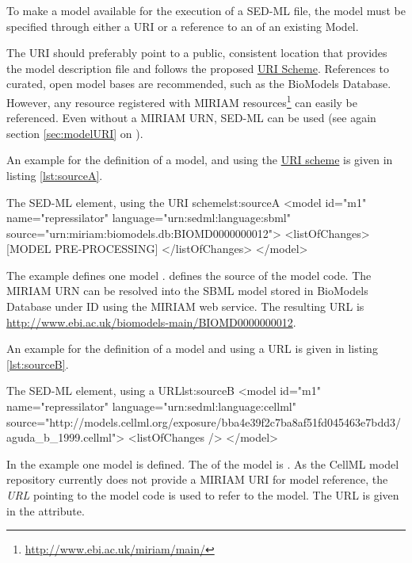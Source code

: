 \subsubsection{}
\label{sec:source}
To make a model available for the execution of a SED-ML file, the model  must be specified through either a URI or a reference to an  of an existing Model. 

The URI should preferably point to a public, consistent location that provides the model description file and follows the proposed \hyperref[sec:uriScheme]{URI Scheme}.
References to curated, open model bases are recommended, such as the BioModels Database. However, any resource registered with MIRIAM resources\footnote{\url{http://www.ebi.ac.uk/miriam/main/}} can easily be referenced. Even without a MIRIAM URN, SED-ML can be used (see again section \ref{sec:modelURI} on ).

An example for the definition of a model, and using the  \hyperref[sec:uriScheme]{URI scheme} is given in listing \ref{lst:sourceA}.
%
\begin{myXmlLst}{The SED-ML  element, using the URI scheme}{lst:sourceA}
 <model id="m1" name="repressilator" language="urn:sedml:language:sbml" 
  source="urn:miriam:biomodels.db:BIOMD0000000012">
  <listOfChanges>
   [MODEL PRE-PROCESSING]
  </listOfChanges>
 </model>
\end{myXmlLst}
%
The example defines one model .  defines the source of the model code. The MIRIAM URN can be resolved into the SBML model stored in BioModels Database under ID  using the MIRIAM web service. The resulting URL is \url{http://www.ebi.ac.uk/biomodels-main/BIOMD0000000012}.

An example for the definition of a model and using a URL is given in listing \ref{lst:sourceB}.
%
\begin{myXmlLst}{The SED-ML  element, using a URL}{lst:sourceB}
 <model id="m1" name="repressilator" language="urn:sedml:language:cellml" 
  source="http://models.cellml.org/exposure/bba4e39f2c7ba8af51fd045463e7bdd3/aguda_b_1999.cellml">
  <listOfChanges />
 </model>
\end{myXmlLst}
%
In the example one model is defined. The  of the model is . As the CellML model repository currently does not provide a MIRIAM URI for model reference, the \emph{URL} pointing to the model code is used to refer to the model. The URL is given in the  attribute.
